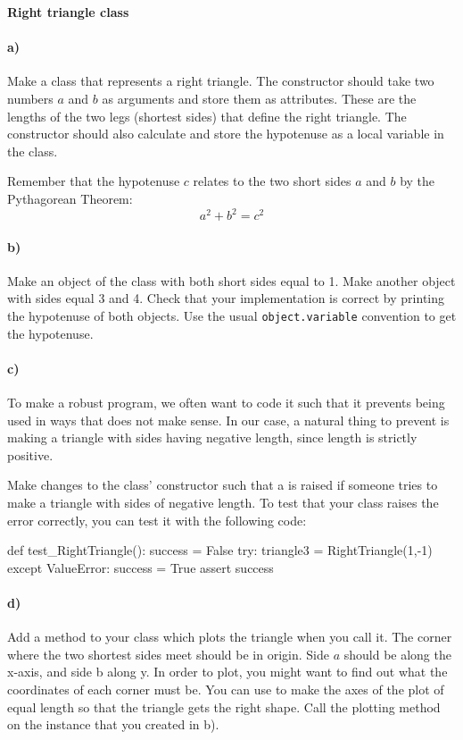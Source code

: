 \begin{Problem}{\textbf{Right triangle class}}
\paragraph{a)}
Make a class  that represents a right triangle. The constructor  should take two numbers $a$ and $b$ as arguments and store them as
attributes. These are the lengths of the two legs (shortest sides) that define the right triangle. The constructor should also calculate and store the hypotenuse as a local variable in the class.

Remember that the hypotenuse $c$ relates to the two short sides $a$ and $b$ by the Pythagorean Theorem:
\begin{equation*}
    a^2 + b^2 = c^2
\end{equation*}

\paragraph{b)}
Make an object  of the class   with both short sides equal to 1. Make another object  with sides equal 3 and 4. Check that your implementation is correct by printing the hypotenuse of both objects. Use the usual \texttt{object.variable} convention to get the hypotenuse.

\paragraph{c)}
To make a robust program, we often want to code it such that it prevents
being used in ways that does not make sense. In our case, a natural thing
to prevent is making a triangle with sides having negative length, since length is strictly positive.

Make changes to the class' constructor such that a  is
raised if someone tries to make a triangle with sides of negative length.
To test that your class raises the error correctly, you can test it with the following code:

\begin{python}
def test_RightTriangle():
    success = False
    try:
        triangle3 = RightTriangle(1,-1)
    except ValueError:
        success = True
    assert success
\end{python}

\paragraph{d)}
Add a method  to your class which plots the triangle
when you call it. The corner where the two shortest sides meet should be in origin.
Side $a$ should be along the x-axis, and side b along y. In order to plot, you
might want to find out what the coordinates of each corner must be. You can use
 to make the axes of the plot of equal length so
that the triangle gets the right shape. Call the plotting method on the
instance  that you created in b).


\end{Problem}
